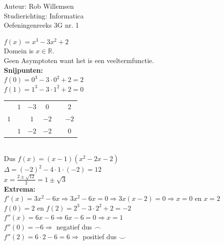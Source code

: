 \documentclass[a4paper]{article}
\begin{document}
\noindent \large Auteur: Rob Willemsen \\
\noindent \large Studierichting: Informatica \\
\noindent \large Oefeningenreeks 3G nr. 1 \\

\medskip

\normalsize

$f(x) = x^3-3x^2+2$ \\

Domein is $x \in \mathbb{R}$. \\

Geen Asymptoten want het is een veeltermfunctie. \\

\textbf{Snijpunten:} \\

$f(0) = 0^3 - 3 \cdot 0^2 + 2 = 2$ \\

$f(1) = 1^3 - 3 \cdot 1^2 + 2 = 0$ \\

\begin{tabular}{c|ccccc}
& $1$ & $-3$ & $0$ & & $2$ \\
$1$ & & $1$ & $-2$ & & $-2$ \\ \hline
& $1$ & $-2$ & $-2$ & \vline & $0$
\end{tabular} \\

Dus $f(x) = (x-1)(x^2-2x-2)$ \\

$\Delta = (-2)^2 - 4 \cdot 1 \cdot (-2) = 12$ \\

$x = \frac{2 \pm \sqrt{12}}{2} = 1 \pm \sqrt{3}$ \\

\textbf{Extrema:} \\

$f'(x) = 3x^2 - 6x \Rightarrow 3x^2 - 6x = 0 \Rightarrow 3x(x - 2) = 0 \Rightarrow x = 0$ en $x = 2$ \\

$f(0) = 2$ en $f(2) = 2^3 - 3 \cdot 2^2 + 2 = -2$ \\

$f''(x) = 6x - 6 \Rightarrow 6x - 6 = 0 \Rightarrow x = 1$ \\

$f''(0) = -6 \Rightarrow$ negatief dus $\frown $ \\

$f''(2) = 6 \cdot 2 - 6 = 6 \Rightarrow$ positief dus $\smile $ \\
\end{document}
